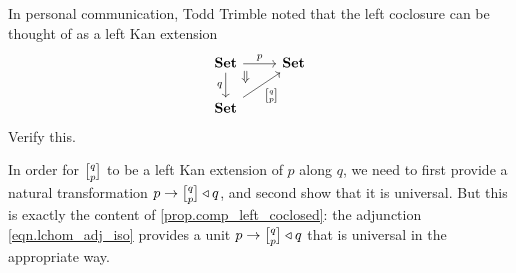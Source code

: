 \documentclass[Book-Poly]{subfiles}
\begin{document}
\begin{exercise}
In personal communication, Todd Trimble noted that the left coclosure can be thought of as a left Kan extension
\[
\begin{tikzcd}
	\smset\ar[r, "p"]\ar[d, "q"']\ar[dr, phantom, very near start, "\Downarrow"]&
	\smset\\
	\smset\ar[ur, "\lchom{q}{p}"']&~
\end{tikzcd}
\]
Verify this.
\end{exercise}
\begin{solution}
In order for $\lchom{q}{p}$ to be a left Kan extension of $p$ along $q$, we need to first provide a natural transformation $p\to \lchom{q}{p}\tri q$, and second show that it is universal. But this is exactly the content of \cref{prop.comp_left_coclosed}: the adjunction \eqref{eqn.lchom_adj_iso} provides a unit $p\to \lchom{q}{p}\tri q$ that is universal in the appropriate way.
\end{solution}
\end{document}
